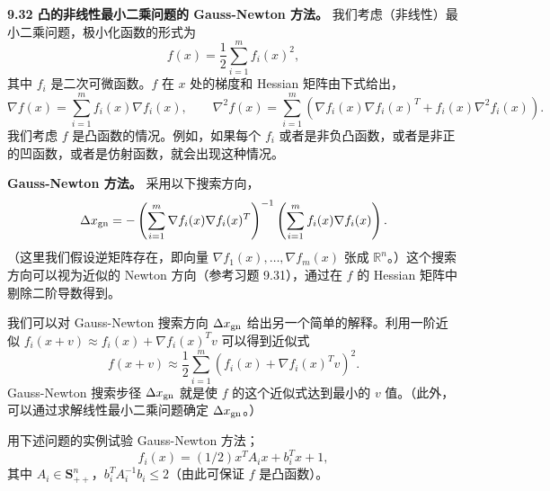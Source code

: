 \documentclass[UTF8,12pt,a4paper,fontset=fandol]{ctexart}
\begin{document}
\noindent\textbf{9.32 凸的非线性最小二乘问题的 Gauss-Newton 方法。}\quad
我们考虑（非线性）最小二乘问题，极小化函数的形式为
\[
f(x)=\frac{1}{2}\sum_{i=1}^m f_i(x)^2,
\]
其中 $f_i$ 是二次可微函数。$f$ 在 $x$ 处的梯度和 Hessian 矩阵由下式给出，
\[
\nabla f(x)=\sum_{i=1}^m f_i(x)\nabla f_i(x),\qquad
\nabla^2 f(x)=\sum_{i=1}^m(\nabla f_i(x)\nabla f_i(x)^T+f_i(x)\nabla^2 f_i(x)).
\]
我们考虑 $f$ 是凸函数的情况。例如，如果每个 $f_i$ 或者是非负凸函数，或者是非正的凹函数，或者是仿射函数，就会出现这种情况。

\noindent\textbf{Gauss-Newton 方法。}\quad
采用以下搜索方向，
\[
\Delta x_{\rm gn}=-\left(\sum_{i=1}^m\nabla f_i(x)\nabla f_i(x)^T\right)^{-1}
\left(\sum_{i=1}^m f_i(x)\nabla f_i(x)\right).
\]
（这里我们假设逆矩阵存在，即向量 $\nabla f_1(x),\ldots,\nabla f_m(x)$ 张成 $\mathbb{R}^n$。）这个搜索方向可以视为近似的 Newton 方向（参考习题 9.31），通过在 $f$ 的 Hessian 矩阵中剔除二阶导数得到。

我们可以对 Gauss-Newton 搜索方向 $\Delta x_{\rm gn}$ 给出另一个简单的解释。利用一阶近似 $f_i(x+v)\approx f_i(x)+\nabla f_i(x)^Tv$ 可以得到近似式
\[
f(x+v)\approx\frac{1}{2}\sum_{i=1}^m(f_i(x)+\nabla f_i(x)^Tv)^2.
\]
Gauss-Newton 搜索步径 $\Delta x_{\rm gn}$ 就是使 $f$ 的这个近似式达到最小的 $v$ 值。（此外，可以通过求解线性最小二乘问题确定 $\Delta x_{\rm gn}$。）

用下述问题的实例试验 Gauss-Newton 方法；
\[
f_i(x)=(1/2)x^TA_ix+b_i^Tx+1,
\]
其中 $A_i\in\mathbf{S}_{++}^n$，$b_i^TA_i^{-1}b_i\leq2$（由此可保证 $f$ 是凸函数）。
\end{document}
